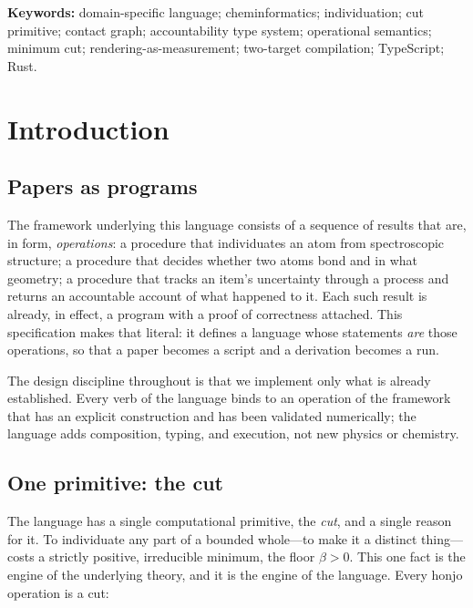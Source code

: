 \documentclass[11pt,a4paper]{article}
\theoremstyle{thmstyle}
\theoremstyle{definition}
\theoremstyle{remark}
\newcommand{\flo}{\beta}
\begin{document}
\noindent\textbf{Keywords:} domain-specific language; cheminformatics;
individuation; cut primitive; contact graph; accountability type system;
operational semantics; minimum cut; rendering-as-measurement; two-target
compilation; TypeScript; Rust.

\tableofcontents

\section{Introduction}
\label{sec:intro}

\subsection{Papers as programs}

The framework underlying this language consists of a sequence of results
that are, in form, \emph{operations}: a procedure that individuates an
atom from spectroscopic structure; a procedure that decides whether two
atoms bond and in what geometry; a procedure that tracks an item's
uncertainty through a process and returns an accountable account of what
happened to it. Each such result is already, in effect, a program with a
proof of correctness attached. This specification makes that literal: it
defines a language whose statements \emph{are} those operations, so that
a paper becomes a script and a derivation becomes a run.

The design discipline throughout is that we implement only what is
already established. Every verb of the language binds to an operation of
the framework that has an explicit construction and has been validated
numerically; the language adds composition, typing, and execution, not
new physics or chemistry.

\subsection{One primitive: the cut}

The language has a single computational primitive, the \emph{cut}, and a
single reason for it. To individuate any part of a bounded whole---to
make it a distinct thing---costs a strictly positive, irreducible
minimum, the floor $\flo>0$. This one fact is the engine of the
underlying theory, and it is the engine of the language. Every honjo
operation is a cut:
\end{document}
